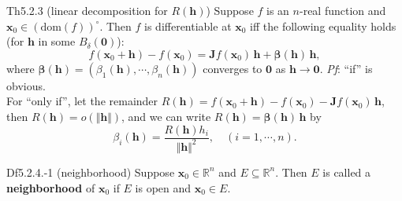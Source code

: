 \documentclass{article}
\begin{document}
\begin{Th}{Th5.2.3 (linear decomposition for $R(\pmb{h})$)}
    Suppose $f$ is an $n$-real function and $\pmb{x}_0\in (\text{dom}(f))^\circ$. Then $f$ is differentiable at $\pmb{x}_0$ iff the following equality holds (for $\pmb{h}$ in some $B_\delta(\pmb{0})$):
    $$ f(\pmb{x}_0 + \pmb{h}) - f(\pmb{x}_0) = \pmb{J}f(\pmb{x}_0)\,\pmb{h} + \pmb{\beta}(\pmb{h})\,\pmb{h}, $$
    where $\pmb{\beta}(\pmb{h}) = (\beta_1(\pmb{h}), \cdots, \beta_n(\pmb{h}))$ converges to $\pmb{0}$ as $\pmb{h}\rightarrow \pmb{0}$.
    \tcblower
    \textit{Pf}: ``if'' is obvious. \\
    For ``only if'', let the remainder $R(\pmb{h}) = f(\pmb{x}_0 + \pmb{h}) - f(\pmb{x}_0) - \pmb{J}f(\pmb{x}_0)\,\pmb{h}$, then $R(\pmb{h}) = o(\Vert \pmb{h}\Vert)$, and we can write $R(\pmb{h}) = \pmb{\beta}(\pmb{h})\,\pmb{h}$ by
    $$\beta_i(\pmb{h}) = \frac{R(\pmb{h})h_i}{\Vert \pmb{h}\Vert^2}, \quad (i=1,\cdots,n).$$
\end{Th}

\begin{Df}{Df5.2.4.-1 (neighborhood)}
    Suppose $\pmb{x}_0\in\mathbb{R}^n$ and $E\subseteq\mathbb{R}^n$. Then $E$ is called a \textbf{neighborhood} of $\pmb{x}_0$ if $E$ is open and $\pmb{x}_0\in E$.
\end{Df}
\end{document}
